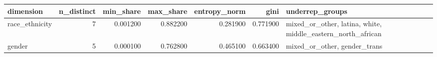 \begin{tabular}{lrrrrrl}
\toprule
dimension & n_distinct & min_share & max_share & entropy_norm & gini & underrep_groups \\
\midrule
race_ethnicity & 7 & 0.001200 & 0.882200 & 0.281900 & 0.771900 & mixed_or_other, latina, white, middle_eastern_north_african \\
gender & 5 & 0.000100 & 0.762800 & 0.465100 & 0.663400 & mixed_or_other, gender_trans \\
\bottomrule
\end{tabular}
